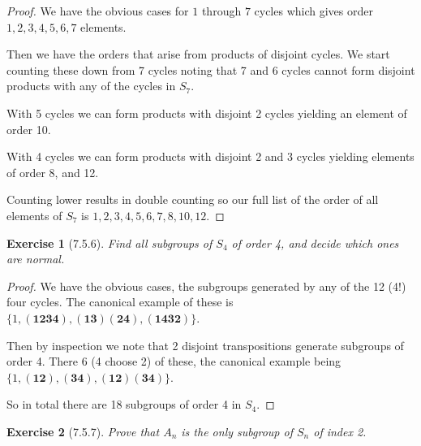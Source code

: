 \documentclass[12pt]{article}
\newtheorem*{exer}{Exercise}
\newcommand{\cycle}[1]{(\mathbf{#1})}
\begin{document}
\begin{proof}

    We have the obvious cases for $1$ through $7$ cycles which gives
    order $1, 2, 3, 4, 5, 6, 7$ elements. 

    Then we have the orders that arise from products of disjoint cycles.
    We start counting these down from 7 cycles noting that 7 and 6
    cycles cannot form disjoint products with any of the cycles in
    $S_7$. 
    
    With 5 cycles we can form products with disjoint 2
    cycles yielding an element of order 10.

    With 4 cycles we can form products with disjoint 2 and 3 cycles
    yielding elements of order 8, and 12.

    Counting lower results in double counting so our full list of the
    order of all elements of $S_7$ is $1, 2, 3, 4, 5, 6, 7, 8, 10, 12$.

\end{proof}


\begin{exer}[7.5.6]

    Find all subgroups of $S_4$ of order 4, and decide which ones are
    normal.

\end{exer}

\begin{proof}

    We have the obvious cases, the subgroups generated by any of the 12
    (4!) four cycles. The canonical example of these is $\{1,
        \cycle{1234}, \cycle{13}\cycle{24}, \cycle{1432} \}$.

    Then by inspection we note that 2 disjoint transpositions generate
    subgroups of order 4. There 6 (4 choose 2) of these, the canonical
    example being $\{1, \cycle{12}, \cycle{34}, \cycle{12}\cycle{34}\}$. 

    So in total there are 18 subgroups of order 4 in $S_4$.

\end{proof}


\begin{exer}[7.5.7]

    Prove that $A_n$ is the only subgroup of $S_n$ of index 2.

\end{exer}
\end{document}
